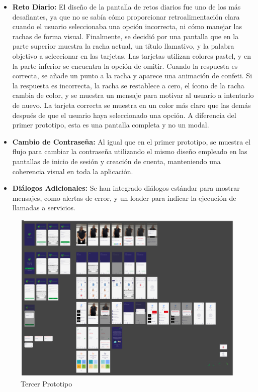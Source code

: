 \begin{itemize}
    \item \textbf{Reto Diario:} El diseño de la pantalla de retos diarios fue uno de los más desafiantes, ya que no se sabía cómo proporcionar retroalimentación clara cuando el usuario seleccionaba una opción incorrecta, ni cómo manejar las rachas de forma visual. Finalmente, se decidió por una pantalla que en la parte superior muestra la racha actual, un título llamativo, y la palabra objetivo a seleccionar en las tarjetas. Las tarjetas utilizan colores pastel, y en la parte inferior se encuentra la opción de omitir. Cuando la respuesta es correcta, se añade un punto a la racha y aparece una animación de confeti. Si la respuesta es incorrecta, la racha se restablece a cero, el ícono de la racha cambia de color, y se muestra un mensaje para motivar al usuario a intentarlo de nuevo. La tarjeta correcta se muestra en un color más claro que las demás después de que el usuario haya seleccionado una opción. A diferencia del primer prototipo, esta es una pantalla completa y no un modal.

     \item \textbf{Cambio de Contraseña:} Al igual que en el primer prototipo, se muestra el flujo para cambiar la contraseña utilizando el mismo diseño empleado en las pantallas de inicio de sesión y creación de cuenta, manteniendo una coherencia visual en toda la aplicación.

    \item \textbf{Diálogos Adicionales:} Se han integrado diálogos estándar para mostrar mensajes, como alertas de error, y un loader para indicar la ejecución de llamadas a servicios. 
        
\end{itemize}

\begin{figure} [H]
    \centering
    \includegraphics[width=1\linewidth]{figuras/tercer_prototipo.png}
    \caption{Tercer Prototipo}
    \label{fig:enter-label}
\end{figure}


